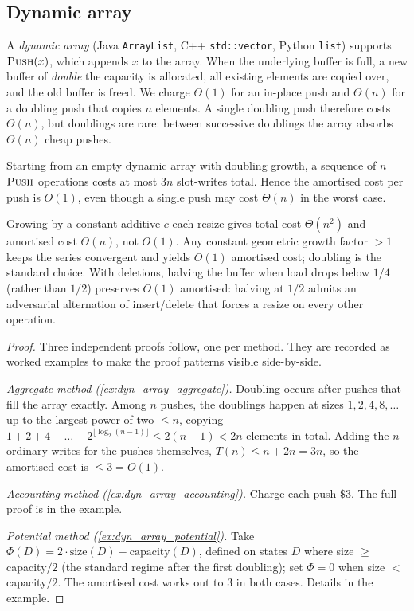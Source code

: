 \subsection{Dynamic array}

A \emph{dynamic array} (Java \texttt{ArrayList}, C++ \texttt{std::vector}, Python \texttt{list}) supports $\textsc{Push}(x)$, which appends $x$ to the array. When the underlying buffer is full, a new buffer of \emph{double} the capacity is allocated, all existing elements are copied over, and the old buffer is freed. We charge $\Theta(1)$ for an in-place push and $\Theta(n)$ for a doubling push that copies $n$ elements. A single doubling push therefore costs $\Theta(n)$, but doublings are rare: between successive doublings the array absorbs $\Theta(n)$ cheap pushes.

\begin{theorem}
\label{thm:dyn_array_amortised}
Starting from an empty dynamic array with doubling growth, a sequence of $n$ $\textsc{Push}$ operations costs at most $3n$ slot-writes total. Hence the amortised cost per push is $O(1)$, even though a single push may cost $\Theta(n)$ in the worst case.
\end{theorem}

\begin{remark}
Growing by a constant additive $c$ each resize gives total cost $\Theta(n^2)$ and amortised cost $\Theta(n)$, not $O(1)$. Any constant geometric growth factor $> 1$ keeps the series convergent and yields $O(1)$ amortised cost; doubling is the standard choice. With deletions, halving the buffer when load drops below $1/4$ (rather than $1/2$) preserves $O(1)$ amortised: halving at $1/2$ admits an adversarial alternation of insert/delete that forces a resize on every other operation.
\end{remark}

\begin{proof}
Three independent proofs follow, one per method. They are recorded as worked examples to make the proof patterns visible side-by-side.

\smallskip
\noindent\emph{Aggregate method (\cref{ex:dyn_array_aggregate}).} Doubling occurs after pushes that fill the array exactly. Among $n$ pushes, the doublings happen at sizes $1, 2, 4, 8, \dots$ up to the largest power of two $\le n$, copying $1 + 2 + 4 + \dots + 2^{\lfloor \log_2 (n-1) \rfloor} \le 2(n-1) < 2n$ elements in total. Adding the $n$ ordinary writes for the pushes themselves, $T(n) \le n + 2n = 3n$, so the amortised cost is $\le 3 = O(1)$.

\smallskip
\noindent\emph{Accounting method (\cref{ex:dyn_array_accounting}).} Charge each push $\$3$. The full proof is in the example.

\smallskip
\noindent\emph{Potential method (\cref{ex:dyn_array_potential}).} Take $\Phi(D) = 2 \cdot \mathrm{size}(D) - \mathrm{capacity}(D)$, defined on states $D$ where size $\ge$ capacity$/2$ (the standard regime after the first doubling); set $\Phi = 0$ when size $<$ capacity$/2$. The amortised cost works out to $3$ in both cases. Details in the example.
\end{proof}

